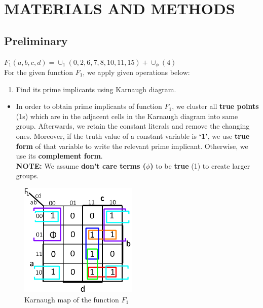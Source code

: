 \documentclass[pdftex,12pt,a4paper]{article}
\begin{document}
\section{MATERIALS AND METHODS}



\subsection{Preliminary}

$ F_1 (a, b, c, d) = \cup_1 (0, 2, 6, 7, 8, 10, 11, 15) + \cup_{\phi} (4)$ \\
For the given function $F_1$, we apply given operations below:
\begin{enumerate}[label=\alph*)]
    \item Find its prime implicants using Karnaugh diagram.
\end{enumerate}
\begin{itemize}
    \item In order to obtain prime implicants of function \textbf{$F_1$}, we cluster all \textbf{true points} (1s) which are in the adjacent cells in the Karnaugh diagram into same group. Afterwards, we retain the constant literals and remove the changing ones. Moreover, if the truth value of a constant variable is \textbf{‘1’}, we use \textbf{true form} of that variable to write the relevant prime implicant. Otherwise, we use its \textbf{complement form}.\\

    \textbf{NOTE:} We assume \textbf{don't care terms ($\phi$)} to be \textbf{true} (1) to create larger groups.
\end{itemize}

\begin{figure}[H]
    \centering
        \includegraphics[width=0.5\textwidth]{map1.png}	
        \caption{Karnaugh map of the function  $F_1$}
        \label{fig1}
\end{figure}
\end{document}
